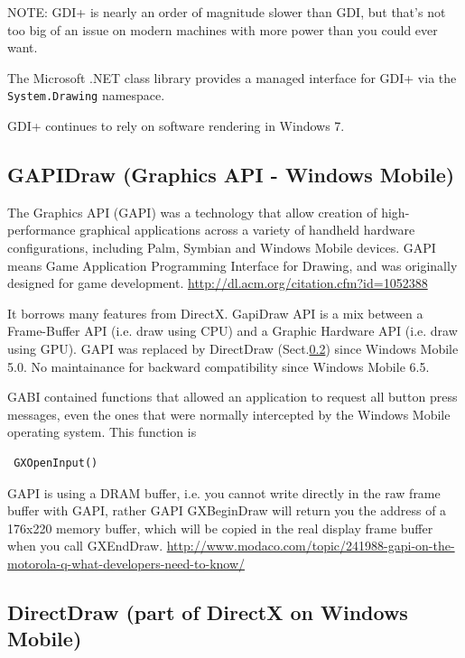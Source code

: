 NOTE: GDI+ is nearly an order of magnitude slower than GDI, but that's not too
big of an issue on modern machines with more power than you could ever want. 

The Microsoft .NET class library provides a managed interface for GDI+ via the
\verb!System.Drawing! namespace.

GDI+ continues to rely on software rendering in Windows 7.

\subsection{GAPIDraw (Graphics API - Windows Mobile)}
\label{sec:GAPI}

The Graphics API (GAPI) was a technology that allow  creation of
high-performance graphical applications across a variety of handheld hardware
configurations, including Palm, Symbian and Windows Mobile devices.
GAPI means Game    Application    Programming    Interface    for    
Drawing, and was originally designed for game development.
\url{http://dl.acm.org/citation.cfm?id=1052388}

It borrows many features from DirectX.
GapiDraw API is a mix between a Frame-Buffer API (i.e. draw using CPU) and a 
Graphic  Hardware  API (i.e. draw using GPU). GAPI was replaced by DirectDraw
(Sect.\ref{sec:DirectDraw}) since Windows Mobile 5.0. No maintainance for
backward compatibility since Windows Mobile 6.5.

GABI contained functions that allowed an application to request all button press
messages, even the ones that were normally intercepted by the Windows Mobile
operating system. This function is
\begin{verbatim}
 GXOpenInput()
\end{verbatim}
 
GAPI is using a DRAM buffer, i.e. you cannot write directly in the raw frame
buffer with GAPI, rather GAPI GXBeginDraw will return you the address of a
176x220 memory buffer, which will be copied in the real display frame buffer
when you call GXEndDraw.
\url{http://www.modaco.com/topic/241988-gapi-on-the-motorola-q-what-developers-need-to-know/}

 
\subsection{DirectDraw (part of DirectX on Windows Mobile)}
\label{sec:DirectDraw}

